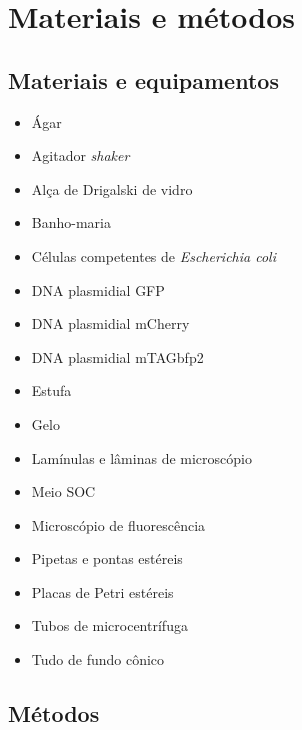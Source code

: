 \section{Materiais e métodos}
\subsection{Materiais e equipamentos}
\begin{multicols}{2} %
\begin{itemize}[label=\boldmath\(\cdot\)]%
    \item Ágar %
    \item Agitador \textit{shaker} %
    \item Alça de Drigalski de vidro %
    \item Banho-maria %
    \item Células competentes de \textit{Escherichia coli} %
    \item DNA plasmidial GFP
    \item DNA plasmidial mCherry
    \item DNA plasmidial mTAGbfp2
    \item Estufa %
    \item Gelo %
    \item Lamínulas e lâminas de microscópio %
    \item Meio SOC %
    \item Microscópio de fluorescência %
    \item Pipetas e pontas estéreis %
    \item Placas de Petri estéreis %
    \item Tubos de microcentrífuga %
    \item Tudo de fundo cônico %
\end{itemize}
\end{multicols}

\subsection{Métodos}
